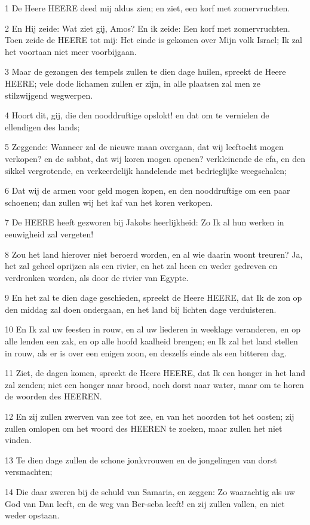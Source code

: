 \par 1 De Heere HEERE deed mij aldus zien; en ziet, een korf met zomervruchten.
\par 2 En Hij zeide: Wat ziet gij, Amos? En ik zeide: Een korf met zomervruchten. Toen zeide de HEERE tot mij: Het einde is gekomen over Mijn volk Israel; Ik zal het voortaan niet meer voorbijgaan.
\par 3 Maar de gezangen des tempels zullen te dien dage huilen, spreekt de Heere HEERE; vele dode lichamen zullen er zijn, in alle plaatsen zal men ze stilzwijgend wegwerpen.
\par 4 Hoort dit, gij, die den nooddruftige opslokt! en dat om te vernielen de ellendigen des lands;
\par 5 Zeggende: Wanneer zal de nieuwe maan overgaan, dat wij leeftocht mogen verkopen? en de sabbat, dat wij koren mogen openen? verkleinende de efa, en den sikkel vergrotende, en verkeerdelijk handelende met bedrieglijke weegschalen;
\par 6 Dat wij de armen voor geld mogen kopen, en den nooddruftige om een paar schoenen; dan zullen wij het kaf van het koren verkopen.
\par 7 De HEERE heeft gezworen bij Jakobs heerlijkheid: Zo Ik al hun werken in eeuwigheid zal vergeten!
\par 8 Zou het land hierover niet beroerd worden, en al wie daarin woont treuren? Ja, het zal geheel oprijzen als een rivier, en het zal heen en weder gedreven en verdronken worden, als door de rivier van Egypte.
\par 9 En het zal te dien dage geschieden, spreekt de Heere HEERE, dat Ik de zon op den middag zal doen ondergaan, en het land bij lichten dage verduisteren.
\par 10 En Ik zal uw feesten in rouw, en al uw liederen in weeklage veranderen, en op alle lenden een zak, en op alle hoofd kaalheid brengen; en Ik zal het land stellen in rouw, als er is over een enigen zoon, en deszelfs einde als een bitteren dag.
\par 11 Ziet, de dagen komen, spreekt de Heere HEERE, dat Ik een honger in het land zal zenden; niet een honger naar brood, noch dorst naar water, maar om te horen de woorden des HEEREN.
\par 12 En zij zullen zwerven van zee tot zee, en van het noorden tot het oosten; zij zullen omlopen om het woord des HEEREN te zoeken, maar zullen het niet vinden.
\par 13 Te dien dage zullen de schone jonkvrouwen en de jongelingen van dorst versmachten;
\par 14 Die daar zweren bij de schuld van Samaria, en zeggen: Zo waarachtig als uw God van Dan leeft, en de weg van Ber-seba leeft! en zij zullen vallen, en niet weder opstaan.

